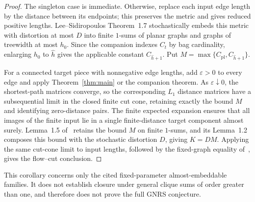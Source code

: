 \begin{proof}
The singleton case is immediate. Otherwise, replace each input edge length
by the distance between its endpoints; this preserves the metric and gives
reduced positive lengths. Lee--Sidiropoulos Theorem~1.7 stochastically embeds
this metric with distortion at most $D$ into finite $1$-sums of planar graphs
and graphs of treewidth at most $h_0$. Since the companion indexes $C_t$ by
bag cardinality, enlarging $h_0$ to $\widehat h$ gives the applicable constant
$C_{\widehat h+1}$. Put $M=\max\{C_{\mathrm{pl}},C_{\widehat h+1}\}$.

For a connected target piece with nonnegative edge lengths, add $\varepsilon>0$
to every edge and apply Theorem~\ref{thm:main} or the companion theorem.
As $\varepsilon\downarrow0$, the shortest-path matrices converge, so the
corresponding $L_1$ distance matrices have a subsequential limit in the closed
finite cut cone, retaining exactly the bound $M$ and identifying zero-distance
pairs. The finite expected expansion
ensures that all images of the finite input lie in a single finite-distance
target component almost surely. Lemma~1.5 of~\cite{LS09} retains the bound
$M$ on finite $1$-sums, and its Lemma~1.2 composes this bound with the
stochastic distortion $D$, giving $K=DM$. Applying the same cut-cone limit
to input lengths, followed by the fixed-graph equality
of~\cite[Section~3, Theorem~3.2]{GNRS04}, gives the flow--cut conclusion.
\end{proof}

This corollary concerns only the cited fixed-parameter almost-embeddable
families. It does not establish closure under general clique sums of order
greater than one, and therefore does not prove the full GNRS conjecture.
